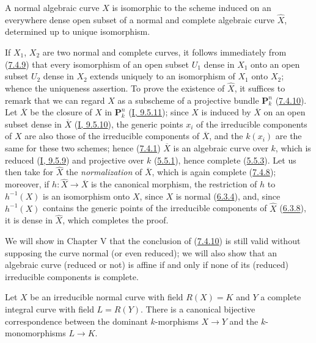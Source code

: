 \begin{corollary}[7.4.11]
\label{II.7.4.11}
A normal algebraic curve $X$ is isomorphic to the scheme induced on an
everywhere dense open subset of a normal and complete algebraic curve
$\widehat{X}$, determined up to unique isomorphism.
\end{corollary}

If $X_1$, $X_2$ are two normal and complete curves, it follows immediately
from (\hyperref[II.7.4.9]{7.4.9}) that every isomorphism of an open subset
$U_1$ dense in $X_1$ onto an open subset $U_2$ dense in $X_2$ extends uniquely
to an isomorphism of $X_1$ onto $X_2$; whence the uniqueness assertion. To
prove the existence of $\widehat{X}$, it suffices to remark that we can
regard $X$ as a subscheme of a projective bundle $\mathbf{P}_k^n$
(\hyperref[II.7.4.10]{7.4.10}). Let $\overline{X}$ be the closure of $X$ in
$\mathbf{P}_k^n$ (\hyperref[I.9.5.11]{I, 9.5.11}); since $X$ is induced
by $\overline{X}$ on an open subset dense in $\overline{X}$
(\hyperref[I.9.5.10]{I, 9.5.10}), the generic points $x_i$ of the
irreducible components of $X$ are also those of the irreducible components
of $\overline{X}$, and the $k(x_i)$ are the same for these two schemes; hence
(\hyperref[II.7.4.1]{7.4.1}) $\overline{X}$ is an algebraic curve over
$k$, which is reduced (\hyperref[I.9.5.9]{I, 9.5.9}) and projective over $k$
(\hyperref[II.5.5.1]{5.5.1}), hence complete
(\hyperref[II.5.5.3]{5.5.3}). Let us then take for $\widehat{X}$ the
\emph{normalization} of $\overline{X}$, which is again complete
(\hyperref[II.7.4.8]{7.4.8}); moreover, if
$h:\widehat{X}\to\overline{X}$ is the canonical morphism, the restriction of
$h$ to $h^{-1}(X)$ is an isomorphism onto $X$, since $X$ is normal
(\hyperref[II.6.3.4]{6.3.4}), and, since $h^{-1}(X)$ contains the generic
points of the irreducible components of $\widehat{X}$
(\hyperref[II.6.3.8]{6.3.8}), it is dense in $\widehat{X}$, which completes
the proof.


\begin{remark}[7.4.12]
\label{II.7.4.12}
We will show in Chapter V that the conclusion of
(\hyperref[II.7.4.10]{7.4.10}) is still valid without supposing the curve
normal (or even reduced); we will also show that an algebraic curve
(reduced or not) is affine if and only if none of its (reduced) irreducible
components is complete.
\end{remark}

\begin{corollary}[7.4.13]
\label{II.7.4.13}
Let $X$ be an irreducible normal curve with field $R(X)=K$ and $Y$ a complete
integral curve with field $L=R(Y)$. There is a canonical bijective
correspondence between the dominant $k$-morphisms $X\to Y$ and the
$k$-monomorphisms $L\to K$.
\end{corollary}

